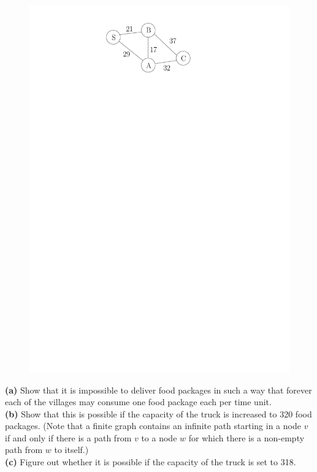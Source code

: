 \documentclass[12pt]{article}
\begin{document}
\begin{figure}[h!]
      \begin{center}
      \includegraphics[]{Graph}
      \end{center}
      \label{fi:graph}
\end{figure}
\noindent \textbf{(a)} Show that it is impossible to deliver food packages in such a way that forever each of the villages may consume one food package each per time unit.\\
\textbf{(b)} Show that this is possible if the capacity of the truck is increased to 320 food packages. (Note that a finite graph contains an infinite path starting in a node $v$ if and only if there is a path from $v$ to a node $w$ for which there is a non-empty path from $w$ to itself.) \\
\textbf{(c)} Figure out whether it is possible if the capacity of the truck is set to 318.
\vspace{8mm}
\end{document}
